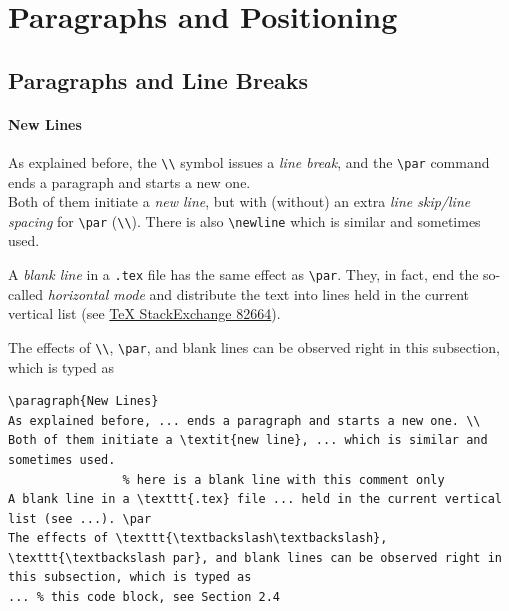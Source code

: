 \section{Paragraphs and Positioning}

\subsection{Paragraphs and Line Breaks}

\paragraph{New Lines}
As explained before, the \texttt{\textbackslash\textbackslash} symbol issues a \textit{line break}, and the \texttt{\textbackslash par} command ends a paragraph and starts a new one. \\
Both of them initiate a \textit{new line}, but with (without) an extra \textit{line skip/line spacing} for \texttt{\textbackslash par} (\texttt{\textbackslash\textbackslash}). There is also \texttt{\textbackslash newline} which is similar and sometimes used.
    
A \textit{blank line} in a \texttt{.tex} file has the same effect as \texttt{\textbackslash par}. They, in fact, end the so-called \textit{horizontal mode} and distribute the text into lines held in the current vertical list (see \href{https://tex.stackexchange.com/questions/82664/when-to-use-par-and-when-newline-or-blank-lines}{\TeX{} StackExchange 82664}). \par 
The effects of \texttt{\textbackslash\textbackslash}, \texttt{\textbackslash par}, and blank lines can be observed right in this subsection, which is typed as
\begin{lstlisting}
\paragraph{New Lines}
As explained before, ... ends a paragraph and starts a new one. \\
Both of them initiate a \textit{new line}, ... which is similar and sometimes used.
                % here is a blank line with this comment only
A blank line in a \texttt{.tex} file ... held in the current vertical list (see ...). \par
The effects of \texttt{\textbackslash\textbackslash}, \texttt{\textbackslash par}, and blank lines can be observed right in this subsection, which is typed as
... % this code block, see Section 2.4
\end{lstlisting}

